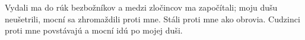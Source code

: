 Vydali ma do rúk bezbožníkov a medzi zločincov ma započítali; moju dušu neušetrili, mocní sa zhromaždili proti mne.
\versseparator
Stáli proti mne ako obrovia.
\versseparator
Cudzinci proti mne povstávajú a mocní idú po mojej duši.